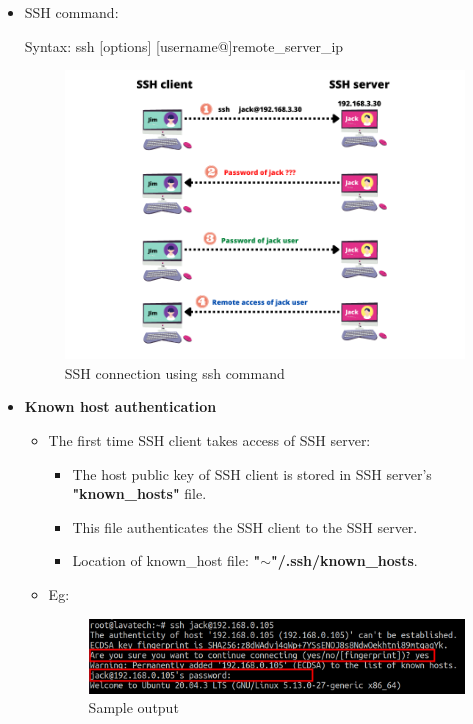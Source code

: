 \setlength{\columnsep}{3pt}
\begin{flushleft}

\bigskip
\begin{itemize}
	\item SSH command:
	\bigskip
	\begin{tcolorbox}[breakable,notitle,boxrule=0pt,colback=pink,colframe=pink]
		\color{black}
		\font=9pt
		Syntax: ssh [options] [username@]remote\_server\_ip
		\font=4pt
	\end{tcolorbox}
	
	\begin{figure}[h!]
		\centering
		\includegraphics[scale=0.7]{content/chapter19/images/ssh_access.png}
		\caption{SSH connection using ssh command}
		\label{fig:stage5}
	\end{figure}		
	
	\newpage
	\item \textbf{Known host authentication}
	\bigskip
	\begin{itemize}
		\item The first time SSH client takes access of SSH server:
		\begin{itemize}
			\item The host public key of SSH client is stored in SSH server's \textbf{"known\_hosts"} file.
			\item This file authenticates the SSH client to the SSH server.
			\item Location of known\_host file: \textbf{{"$\sim$"}/.ssh/known\_hosts}.
		\end{itemize}
	
		\item Eg:
		\begin{figure}[h!]
			\centering
			\includegraphics[scale=0.3]{content/chapter19/images/ssh6.png}
			\caption{Sample output}
			\label{fig:stage55}
		\end{figure}
		

\end{itemize}
\end{itemize}
\end{flushleft}
